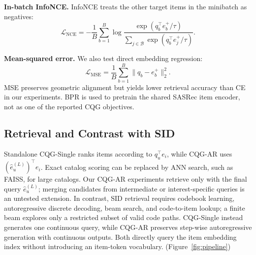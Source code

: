 \documentclass[letterpaper]{article}
\begin{document}
\textbf{In-batch InfoNCE.}
InfoNCE treats the other target items in the minibatch as negatives:
\begin{equation}
\mathcal{L}_{\mathrm{NCE}}
=-\frac{1}{B}\sum_{b=1}^{B}\log
\frac{\exp(q_b^\top e_b^+/\tau)}
{\sum_{j\in\mathcal B}\exp(q_b^\top e_j^+/\tau)} .
\end{equation}

\textbf{Mean-squared error.}
We also test direct embedding regression:
\begin{equation}
\mathcal{L}_{\mathrm{MSE}}
=\frac{1}{B}\sum_{b=1}^{B}\|q_b-e_b^+\|_2^2 .
\end{equation}
MSE preserves geometric alignment but yields lower retrieval accuracy than CE
in our experiments. BPR is used to pretrain the shared SASRec item encoder,
not as one of the reported CQG objectives.

\subsection{Retrieval and Contrast with SID}

Standalone CQG-Single ranks items according to $q_u^\top e_i$, while CQG-AR uses $(\hat e_u^{(L)})^\top e_i$. Exact catalog scoring can be replaced by ANN search, such as FAISS, for large catalogs. Our CQG-AR experiments retrieve only with the final query \(\hat e_u^{(L)}\); merging candidates from intermediate or interest-specific queries is an untested extension. In contrast, SID retrieval requires codebook learning, autoregressive discrete decoding, beam search, and code-to-item lookup; a finite beam explores only a restricted subset of valid code paths. CQG-Single instead generates one continuous query, while CQG-AR preserves step-wise autoregressive generation with continuous outputs. Both directly query the item embedding index without introducing an item-token vocabulary. (Figure~\ref{fig:pipeline})


\end{document}
